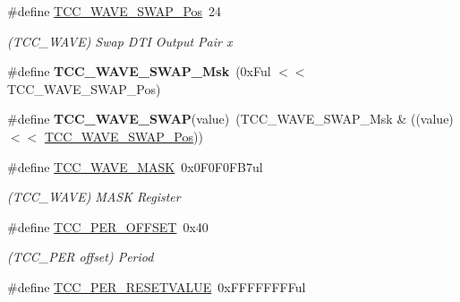 \begin{DoxyCompactItemize}
\item 
\hypertarget{group___s_a_m_l21___t_c_c_ga4793cca94f1a601ac690668563c7495d}{}\#define \hyperlink{group___s_a_m_l21___t_c_c_ga4793cca94f1a601ac690668563c7495d}{T\+C\+C\+\_\+\+W\+A\+V\+E\+\_\+\+S\+W\+A\+P\+\_\+\+Pos}~24\label{group___s_a_m_l21___t_c_c_ga4793cca94f1a601ac690668563c7495d}

\begin{DoxyCompactList}\small\item\em (T\+C\+C\+\_\+\+W\+A\+V\+E) Swap D\+T\+I Output Pair x \end{DoxyCompactList}\item 
\hypertarget{group___s_a_m_l21___t_c_c_ga06a000bedeb91c0552d536887bb245ba}{}\#define {\bfseries T\+C\+C\+\_\+\+W\+A\+V\+E\+\_\+\+S\+W\+A\+P\+\_\+\+Msk}~(0x\+Ful $<$$<$ T\+C\+C\+\_\+\+W\+A\+V\+E\+\_\+\+S\+W\+A\+P\+\_\+\+Pos)\label{group___s_a_m_l21___t_c_c_ga06a000bedeb91c0552d536887bb245ba}

\item 
\hypertarget{group___s_a_m_l21___t_c_c_ga99ca5d92e2bb414cde38a3f8ee2c32c0}{}\#define {\bfseries T\+C\+C\+\_\+\+W\+A\+V\+E\+\_\+\+S\+W\+A\+P}(value)~(T\+C\+C\+\_\+\+W\+A\+V\+E\+\_\+\+S\+W\+A\+P\+\_\+\+Msk \& ((value) $<$$<$ \hyperlink{group___s_a_m_l21___t_c_c_ga4793cca94f1a601ac690668563c7495d}{T\+C\+C\+\_\+\+W\+A\+V\+E\+\_\+\+S\+W\+A\+P\+\_\+\+Pos}))\label{group___s_a_m_l21___t_c_c_ga99ca5d92e2bb414cde38a3f8ee2c32c0}

\item 
\hypertarget{group___s_a_m_l21___t_c_c_ga8bb20aad54e01fe5a3fecfd132d81178}{}\#define \hyperlink{group___s_a_m_l21___t_c_c_ga8bb20aad54e01fe5a3fecfd132d81178}{T\+C\+C\+\_\+\+W\+A\+V\+E\+\_\+\+M\+A\+S\+K}~0x0\+F0\+F0\+F\+B7ul\label{group___s_a_m_l21___t_c_c_ga8bb20aad54e01fe5a3fecfd132d81178}

\begin{DoxyCompactList}\small\item\em (T\+C\+C\+\_\+\+W\+A\+V\+E) M\+A\+S\+K Register \end{DoxyCompactList}\item 
\hypertarget{group___s_a_m_l21___t_c_c_gaf8208efca9213e0294ba91b85e61085c}{}\#define \hyperlink{group___s_a_m_l21___t_c_c_gaf8208efca9213e0294ba91b85e61085c}{T\+C\+C\+\_\+\+P\+E\+R\+\_\+\+O\+F\+F\+S\+E\+T}~0x40\label{group___s_a_m_l21___t_c_c_gaf8208efca9213e0294ba91b85e61085c}

\begin{DoxyCompactList}\small\item\em (T\+C\+C\+\_\+\+P\+E\+R offset) Period \end{DoxyCompactList}\item 
\hypertarget{group___s_a_m_l21___t_c_c_ga60f224a87ab36d0d11e17b21a84fa112}{}\#define \hyperlink{group___s_a_m_l21___t_c_c_ga60f224a87ab36d0d11e17b21a84fa112}{T\+C\+C\+\_\+\+P\+E\+R\+\_\+\+R\+E\+S\+E\+T\+V\+A\+L\+U\+E}~0x\+F\+F\+F\+F\+F\+F\+F\+Ful\label{group___s_a_m_l21___t_c_c_ga60f224a87ab36d0d11e17b21a84fa112}


\end{DoxyCompactItemize}
